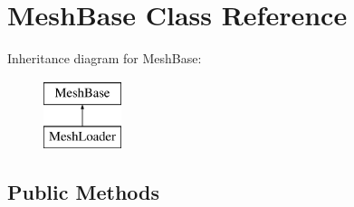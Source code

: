 \hypertarget{class_mesh_base}{}\section{Mesh\+Base Class Reference}
\label{class_mesh_base}
Inheritance diagram for Mesh\+Base\+:\begin{figure}[H]
\begin{center}
\leavevmode
\includegraphics[height=2.000000cm]{class_mesh_base}
\end{center}
\end{figure}
\subsection*{Public Methods}
